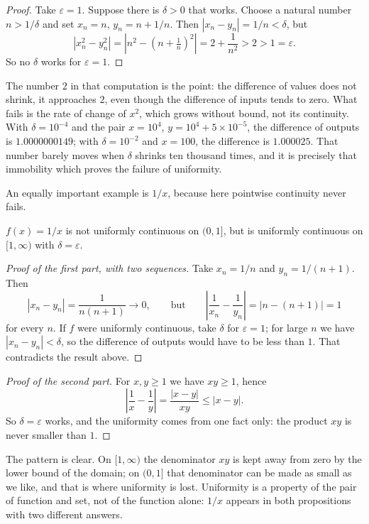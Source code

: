 \begin{proof}
Take $\varepsilon=1$. Suppose there is $\delta>0$ that works. Choose a natural number
$n>1/\delta$ and set $x_{n}=n$, $y_{n}=n+1/n$. Then $|x_{n}-y_{n}|=1/n<\delta$,
but
\[
|x_{n}^{2}-y_{n}^{2}|=\left|n^{2}-\left(n+\tfrac1n\right)^{2}\right|
=2+\frac{1}{n^{2}}>2>1=\varepsilon .
\]
So no $\delta$ works for $\varepsilon=1$.
\end{proof}

The number $2$ in that computation is the point: the difference of values does not
shrink, it approaches $2$, even though the difference of inputs tends to zero. What fails
is the rate of change of $x^{2}$, which grows without bound, not its continuity. With
$\delta=10^{-4}$ and the pair $x=10^{4}$, $y=10^{4}+5\times10^{-5}$, the difference of
outputs is $1.0000000149$; with $\delta=10^{-2}$ and $x=100$, the difference is
$1.000025$. That number barely moves when $\delta$ shrinks ten thousand
times, and it is precisely that immobility which proves the failure of uniformity.

An equally important example is $1/x$, because here pointwise continuity never fails.

\begin{proposisi}
$f(x)=1/x$ is not uniformly continuous on $(0,1]$, but is uniformly continuous on
$[1,\infty)$ with $\delta=\varepsilon$.
\end{proposisi}

\begin{proof}[Proof of the first part, with two sequences]
Take $x_{n}=1/n$ and $y_{n}=1/(n+1)$. Then
\[
|x_{n}-y_{n}|=\frac{1}{n(n+1)}\longrightarrow 0,
\qquad\text{but}\qquad
\left|\frac{1}{x_{n}}-\frac{1}{y_{n}}\right|=|n-(n+1)|=1
\]
for every $n$. If $f$ were uniformly continuous, take $\delta$ for $\varepsilon=1$;
for large $n$ we have $|x_{n}-y_{n}|<\delta$, so the difference of outputs would have to
be less than $1$. That contradicts the result above.
\end{proof}

\begin{proof}[Proof of the second part]
For $x,y\ge 1$ we have $xy\ge 1$, hence
\[
\left|\frac{1}{x}-\frac{1}{y}\right|=\frac{|x-y|}{xy}\le|x-y| .
\]
So $\delta=\varepsilon$ works, and the uniformity comes from one fact only: the
product $xy$ is never smaller than $1$.
\end{proof}

The pattern is clear. On $[1,\infty)$ the denominator $xy$ is kept away from zero by the
lower bound of the domain; on $(0,1]$ that denominator can be made as small as we like,
and that is where uniformity is lost. Uniformity is a property of the pair of function and
set, not of the function alone: $1/x$ appears in both propositions with two different
answers.

